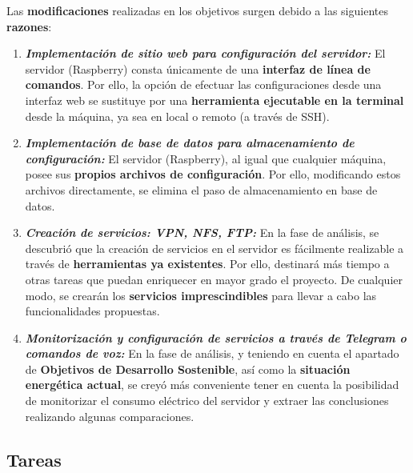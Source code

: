 Las \textbf{modificaciones} realizadas en los objetivos surgen debido a las siguientes \textbf{razones}:
\begin{enumerate}[itemsep=0em]
    \item \vspace{2pt} \textit{\textbf{Implementación de sitio web para configuración del servidor:}} \newline
    El servidor (Raspberry) consta únicamente de una \textbf{interfaz de línea de comandos}. Por ello, la opción de efectuar las configuraciones desde una interfaz web se sustituye por una \textbf{herramienta ejecutable en la terminal} desde la máquina, ya sea en local o remoto (a través de SSH).

    \item \vspace{2pt} \textit{\textbf{Implementación de base de datos para almacenamiento de configuración:}} \newline
    El servidor (Raspberry), al igual que cualquier máquina, posee sus \textbf{propios archivos de configuración}. Por ello, modificando estos archivos directamente, se elimina el paso de almacenamiento en base de datos. \pagebreak

    \item \vspace{2pt} \textit{\textbf{Creación de servicios: VPN, NFS, FTP:}} \newline
    En la fase de análisis, se descubrió que la creación de servicios en el servidor es fácilmente realizable a través de \textbf{herramientas ya existentes}. Por ello, destinará más tiempo a otras tareas que puedan enriquecer en mayor grado el proyecto. De cualquier modo, se crearán los \textbf{servicios imprescindibles} para llevar a cabo las funcionalidades propuestas.

    \item \vspace{2pt} \textit{\textbf{Monitorización y configuración de servicios a través de Telegram o comandos de voz:}} \newline
    En la fase de análisis, y teniendo en cuenta el apartado de \textbf{Objetivos de Desarrollo Sostenible}, así como la \textbf{situación energética actual}, se creyó más conveniente tener en cuenta la posibilidad de monitorizar el consumo eléctrico del servidor y extraer las conclusiones realizando algunas comparaciones.
\end{enumerate}

\subsection{Tareas} \label{chapters:revision:sections:revision:subsections:tareas}

